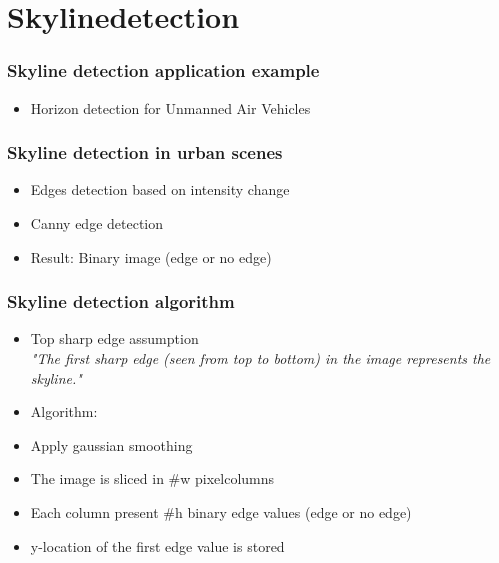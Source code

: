 \documentclass{beamer}
\begin{document}
\frame
{
}

\section{Skylinedetection}
\frame
{
	\frametitle{Skyline detection application example}
	\begin{itemize}
		\item <+-| alert@+> Horizon detection for Unmanned Air Vehicles
	\end{itemize}
}

\frame
{
	\frametitle{Skyline detection in urban scenes}%
	\begin{itemize}
		\item <+-| alert@+> Edges detection based on intensity change
		\item <+-| alert@+> Canny edge detection 
		\item <+-| alert@+> Result: Binary image (edge or no edge)

	\end{itemize}
}


\frame
{
	\frametitle{Skyline detection algorithm}%
	\begin{itemize}
		\item <+-| alert@+> Top sharp edge assumption\\
		\emph{"The first sharp edge (seen from top to bottom) in the image represents the skyline."}
		\item Algorithm:
		\item <+-| alert@+> Apply gaussian smoothing
		\item <+-| alert@+> The image is sliced in \#w pixelcolumns
		\item <+-| alert@+> Each column present \#h binary edge values (edge or no edge)
		\item <+-| alert@+> y-location of the first edge value is stored 
	\end{itemize}
}
\end{document}
